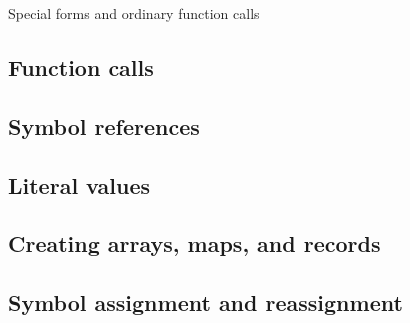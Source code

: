 \documentclass{article}
\theoremstyle{definition}
\begin{document}
Special forms and ordinary function calls

\hypertarget{hsec:function-call}{}
\subsection{Function calls}
\label{sec:function-call}

\hypertarget{hsec:symbol-ref}{}
\subsection{Symbol references}
\label{sec:symbol-ref}

\hypertarget{hsec:literals}{}
\subsection{Literal values}
\label{sec:literals}



\hypertarget{hsec:new-form}{}
\subsection{Creating arrays, maps, and records}
\label{sec:new-form}


\hypertarget{hsec:let-set}{}
\subsection{Symbol assignment and reassignment}
\label{sec:let-set}
\end{document}
